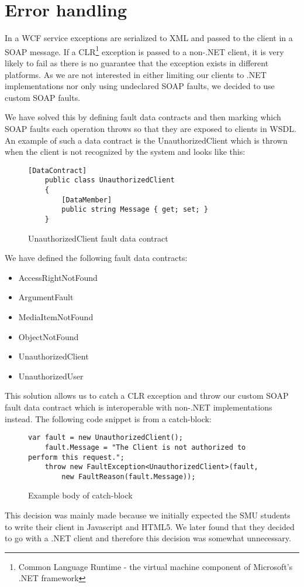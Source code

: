 \documentclass[../report.tex]{subfiles}
\begin{document}
\section{Error handling}
In a WCF service exceptions are serialized to XML and passed to the client in a SOAP message. If a CLR\footnote{Common Language Runtime - the virtual machine component of Microsoft's .NET framework} exception is passed to a non-.NET client, it is very likely to fail as there is no guarantee that the exception exists in different platforms. As we are not interested in either limiting our clients to .NET implementations nor only using undeclared SOAP faults, we decided to use custom SOAP faults. 

We have solved this by defining fault data contracts and then marking which SOAP faults each operation throws so that they are exposed to clients in WSDL. An example of such a data contract is the UnauthorizedClient which is thrown when the client is not recognized by the system and looks like this:

\begin{figure}[H]
\begin{lstlisting}[frame=single]
    [DataContract]
    public class UnauthorizedClient
    {
        [DataMember]
        public string Message { get; set; }
    }
\end{lstlisting}
\caption{UnauthorizedClient fault data contract}
\end{figure}

We have defined the following fault data contracts:

\begin{itemize}
\item AccessRightNotFound
\item ArgumentFault
\item MediaItemNotFound
\item ObjectNotFound
\item UnauthorizedClient
\item UnauthorizedUser
\end{itemize}

This solution allows us to catch a CLR exception and throw our custom SOAP fault data contract which is interoperable with non-.NET implementations instead. The following code snippet is from a catch-block:

\begin{figure}[H]
\begin{lstlisting}[frame=single]
    var fault = new UnauthorizedClient();
    fault.Message = "The Client is not authorized to perform this request.";
    throw new FaultException<UnauthorizedClient>(fault, 
        new FaultReason(fault.Message));
\end{lstlisting}
\caption{Example body of catch-block}
\end{figure}

This decision was mainly made because we initially expected the SMU students to write their client in Javascript and HTML5. We later found that they decided to go with a .NET client and therefore this decision was somewhat unnecessary. 
\end{document}
